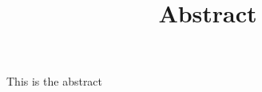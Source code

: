 \documentclass[12pt,twoside,a4paper]{report}
\title{Abstract}
\begin{document}
This is the abstract
\end{document}
